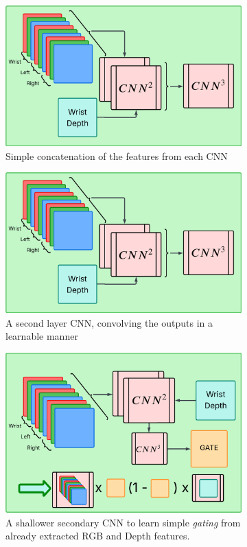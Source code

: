 \begin{figure}[htpb]
  \centering
  \begin{subfigure}{0.45\linewidth}
    \centering
    \includegraphics[width=0.5\linewidth]{assets/cam-comb/policies/wlr_d-feats-diagram.png}
    \caption{Simple concatenation of the features from each CNN}\label{subfig:policies-wlr_d}
  \end{subfigure}
  \hfill
  \begin{subfigure}{0.45\linewidth}
    \centering
    \includegraphics[width=0.5\linewidth]{assets/cam-comb/policies/wlr_d-feats-diagram.png}
    \caption{A second layer CNN, convolving the outputs in a learnable manner}\label{subfig:policies-wrl_d-feats}
  \end{subfigure}
  \vspace{0.5cm}
  \begin{subfigure}{0.45\linewidth}
    \centering
    \includegraphics[width=0.5\linewidth]{assets/cam-comb/policies/wlr_d-gated-diagram.png}
    \caption{A shallower secondary CNN to learn simple \emph{gating} from already extracted RGB and Depth features.}\label{subfig:policies-wrl_d-gated}
  \end{subfigure}
  \hfill
  \begin{subfigure}{0.45\linewidth}

\end{subfigure}
\end{figure}
